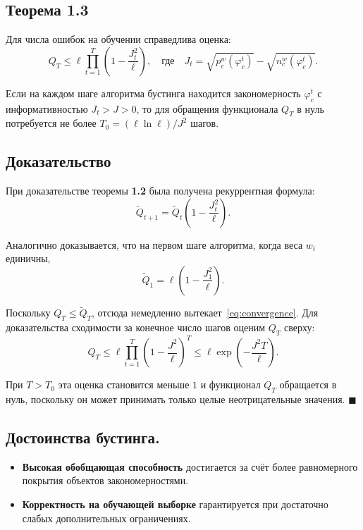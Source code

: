 \begin{itemize}
\subsection*{Теорема 1.3}
Для числа ошибок на обучении справедлива оценка:
\begin{equation}
    Q_T \leq \ell \prod_{t=1}^T \left( 1 - \frac{J_t^2}{\ell} \right), \quad \text{где} \quad J_t = \sqrt{p_c^w(\varphi_c^t)} - \sqrt{n_c^w(\varphi_c^t)}.
    \label{eq:convergence}
\end{equation}

Если на каждом шаге алгоритма бустинга находится закономерность $\varphi_c^t$ с информативностью $J_t > J > 0$, то для обращения функционала $Q_T$ в нуль потребуется не более $T_0 = (\ell \ln \ell) / J^2$ шагов.

\subsection*{Доказательство}
При доказательстве теоремы \textbf{1.2} была получена рекуррентная формула:
\begin{equation}
    \tilde{Q}_{t+1} = \tilde{Q}_t \left( 1 - \frac{J_t^2}{\ell} \right).
\end{equation}

Аналогично доказывается, что на первом шаге алгоритма, когда веса $w_i$ единичны,
\[
    \tilde{Q}_1 = \ell \left( 1 - \frac{J_1^2}{\ell} \right).
\]

Поскольку $Q_T \leq \tilde{Q}_T$, отсюда немедленно вытекает~\eqref{eq:convergence}. Для доказательства сходимости за конечное число шагов оценим $Q_T$ сверху:
\[
    Q_T \leq \ell \prod_{t=1}^T \left( 1 - \frac{J^2}{\ell} \right)^T \leq \ell \exp\left( -\frac{J^2 T}{\ell} \right).
\]

При $T > T_0$ эта оценка становится меньше $1$ и функционал $Q_T$ обращается в нуль, поскольку он может принимать только целые неотрицательные значения. \hfill $\blacksquare$

\subsection*{Достоинства бустинга.}

\begin{itemize}
    \item \textbf{Высокая обобщающая способность} достигается за счёт более равномерного покрытия объектов закономерностями.

    \item \textbf{Корректность на обучающей выборке} гарантируется при достаточно слабых дополнительных ограничениях.


\end{itemize}
\end{itemize}
